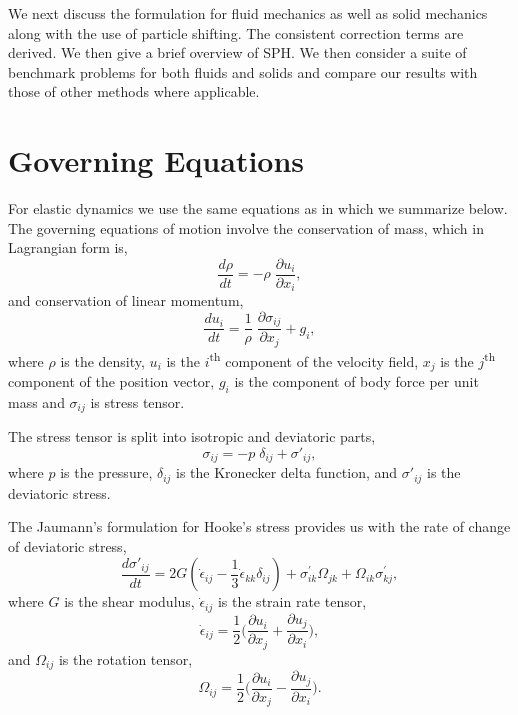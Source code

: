 We next discuss the formulation for fluid mechanics as well as solid mechanics
along with the use of particle shifting. The consistent correction terms are
derived. We then give a brief overview of SPH. We then consider a suite of
benchmark problems for both fluids and solids and compare our results with those
of other methods where applicable.

\section{Governing Equations}
For elastic dynamics we use the same equations as in
\citep{gray-ed-2001,zhang_hu_adams17} which we summarize below. The governing
equations of motion involve the conservation of mass, which in Lagrangian
form is,
\begin{equation}
  \label{eq:ce}
  \frac{d \rho}{d t} = - \rho \; \frac{\partial u_i}{\partial x_i},
\end{equation}
and conservation of linear momentum,
\begin{equation}
  \label{eq:me}
  \frac{d u_i}{d t} = \frac{1}{\rho} \; \frac{\partial \sigma_{ij}}{\partial x_j}
  + g_i,
\end{equation}
where $\rho$ is the density, $u_i$ is the $i$\textsuperscript{th} component of
the velocity field, $x_j$ is the $j$\textsuperscript{th} component of the
position vector, $g_i$ is the component of body force per unit mass and
$\sigma_{ij}$ is stress tensor.

The stress tensor is split into isotropic and deviatoric parts,
\begin{equation}
  \label{eq:stress_tensor_decomposition}
  \sigma_{ij} = - p \; \delta_{ij} + \sigma'_{ij},
\end{equation}
%
where $p$ is the pressure, $\delta_{ij}$ is the Kronecker delta function, and
$\sigma'_{ij}$ is the deviatoric stress.

The Jaumann's formulation for Hooke's stress provides us with the rate of
change of deviatoric stress,
\begin{equation}
  \label{eq:jaumann-stress-rate}
  \frac{d \sigma'_{ij}}{dt} = 2G (\dot{\epsilon}_{ij} - \frac{1}{3}
  \dot{\epsilon}_{kk} \delta_{ij}) + \sigma^{'}_{ik}  \Omega_{jk} +
  \Omega_{ik} \sigma^{'}_{kj},
\end{equation}
where $G$ is the shear modulus, $\dot{\epsilon}_{ij}$ is the strain rate tensor,
\begin{equation}
  \label{eq:strain-tensor}
  \dot{\epsilon}_{ij} = \frac{1}{2} \bigg(\frac{\partial u_i}{\partial x_j} +
  \frac{\partial u_j}{\partial x_i} \bigg),
\end{equation}
and $\Omega_{ij}$ is the rotation tensor,
\begin{equation}
  \label{eq:rotational-tensor}
  \Omega_{ij} = \frac{1}{2} \bigg(\frac{\partial u_i}{\partial x_j} -
  \frac{\partial u_j}{\partial x_i} \bigg).
\end{equation}

